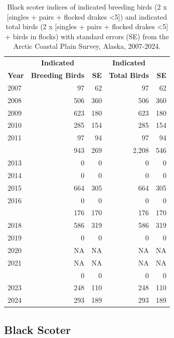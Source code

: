 \documentclass[
]{article}
\begin{document}
\begingroup\fontsize{10}{12}\selectfont

\begin{longtable}[t]{lrrrr}

\caption{\label{tbl-BLSC}Black scoter indices of indicated breeding
birds (2 x {[}singles + pairs + flocked drakes \textless5{]}) and
indicated total birds (2 x {[}singles + pairs + flocked drakes
\textless5{]} + birds in flocks) with standard errors (SE) from the
Arctic Coastal Plain Survey, Alaska, 2007-2024.}

\tabularnewline

\\
\toprule
\multicolumn{1}{c}{\textbf{ }} & \multicolumn{1}{c}{\textbf{Indicated}} & \multicolumn{1}{c}{\textbf{ }} & \multicolumn{1}{c}{\textbf{Indicated}} & \multicolumn{1}{c}{\textbf{ }} \\
\cmidrule(l{3pt}r{3pt}){2-2} \cmidrule(l{3pt}r{3pt}){4-4}
\textbf{Year} & \textbf{Breeding Birds} & \textbf{SE} & \textbf{Total Birds} & \textbf{SE}\\
\midrule
2007 & 97 & 62 & 97 & 62\\
2008 & 506 & 360 & 506 & 360\\
2009 & 623 & 180 & 623 & 180\\
2010 & 285 & 154 & 285 & 154\\
2011 & 97 & 94 & 97 & 94\\
\addlinespace
2012 & 943 & 269 & 2,208 & 546\\
2013 & 0 & 0 & 0 & 0\\
2014 & 0 & 0 & 0 & 0\\
2015 & 664 & 305 & 664 & 305\\
2016 & 0 & 0 & 0 & 0\\
\addlinespace
2017 & 176 & 170 & 176 & 170\\
2018 & 586 & 319 & 586 & 319\\
2019 & 0 & 0 & 0 & 0\\
2020 & NA & NA & NA & NA\\
2021 & NA & NA & NA & NA\\
\addlinespace
2022 & 0 & 0 & 0 & 0\\
2023 & 248 & 110 & 248 & 110\\
2024 & 293 & 189 & 293 & 189\\
\bottomrule

\end{longtable}

\endgroup{}

\newpage{}

\subsection*{Black Scoter}\label{black-scoter-2}
\end{document}
